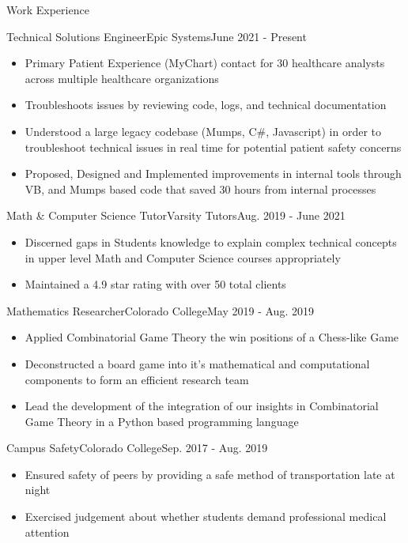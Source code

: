 \begin{cvsection}{Work Experience}
	\begin{cvsubsection}{Technical Solutions Engineer}{Epic Systems}{June 2021 - Present}			
		\begin{itemize}
			\item Primary Patient Experience (MyChart) contact for 30 healthcare analysts across multiple healthcare organizations
			\item Troubleshoots issues by reviewing code, logs, and technical documentation
			\item Understood a large legacy codebase (Mumps, C\#, Javascript) in order to troubleshoot technical issues in real time for potential patient safety concerns
			\item Proposed, Designed and Implemented improvements in internal tools through VB, and Mumps based code that saved 30 hours from internal processes
		\end{itemize}
	\end{cvsubsection}
	
	\begin{cvsubsection}{Math \& Computer Science Tutor}{Varsity Tutors}{Aug. 2019 - June 2021}	
		\begin{itemize}
			\item Discerned gaps in Students knowledge to explain complex technical concepts in upper level Math and Computer Science courses appropriately
			\item Maintained a 4.9 star rating with over 50 total clients
		\end{itemize}
	\end{cvsubsection}
	
	\begin{cvsubsection}{Mathematics Researcher}{Colorado College}{May 2019 - Aug. 2019}
	\begin{itemize}
		\item Applied Combinatorial Game Theory the win positions of a Chess-like Game
		\item Deconstructed a board game into it’s mathematical and computational components to form an efficient research team
		\item Lead the development of the integration of our insights in Combinatorial Game Theory in a Python based programming language
		\end{itemize}
	\end{cvsubsection}
	
		\begin{cvsubsection}{Campus Safety}{Colorado College}{Sep. 2017 - Aug. 2019}
	\begin{itemize}
		\item Ensured safety of peers by providing a safe method of transportation late at night
		\item Exercised judgement about whether students demand professional medical attention
		\end{itemize}
	\end{cvsubsection}
	
\end{cvsection}



